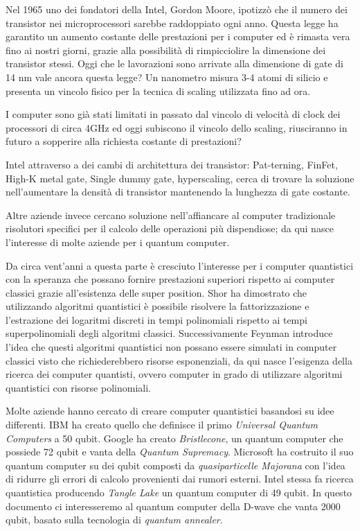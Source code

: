 \cite{S24}Nel 1965 uno dei fondatori della Intel, Gordon Moore, ipotizzò che il numero dei transistor nei microprocessori sarebbe raddoppiato ogni anno. Questa legge ha garantito un aumento costante delle prestazioni per i computer ed è rimasta vera fino ai nostri giorni, grazie alla possibilità di rimpicciolire la dimensione dei transistor stessi. Oggi che le lavorazioni sono arrivate alla dimensione di gate di 14 nm vale ancora questa legge? Un nanometro misura 3-4 atomi di silicio e presenta un vincolo fisico per la tecnica di scaling utilizzata fino ad ora.

I computer sono già stati limitati in passato dal vincolo di velocità di clock dei processori di circa 4GHz ed oggi subiscono il vincolo dello scaling, riusciranno in futuro a sopperire alla richiesta costante di prestazioni?

Intel attraverso a dei cambi di architettura dei transistor: Pat-terning, FinFet, High-K metal gate, Single dummy gate, hyperscaling, cerca di trovare la soluzione nell'aumentare la densità di transistor mantenendo la lunghezza di gate costante.

Altre aziende invece cercano soluzione nell'affiancare al computer tradizionale risolutori specifici per il calcolo delle operazioni più dispendiose; da qui nasce l'interesse di molte aziende per i quantum computer.

\cite{NAC}Da circa vent'anni a questa parte è cresciuto l'interesse per i computer quantistici con la speranza che possano fornire prestazioni superiori rispetto ai computer classici grazie all'esistenza delle super position. Shor ha dimostrato che utilizzando algoritmi quantistici è possibile risolvere la fattorizzazione e l'estrazione dei logaritmi discreti in tempi polinomiali rispetto ai tempi superpolinomiali degli algoritmi classici. Successivamente Feynman introduce l'idea che questi algoritmi quantistici non possano essere simulati in computer classici visto che richiederebbero risorse esponenziali, da qui nasce l'esigenza della ricerca dei computer quantisti, ovvero computer in grado di utilizzare algoritmi quantistici con risorse polinomiali.

Molte aziende hanno cercato di creare computer quantistici basandosi su idee differenti. IBM ha creato quello che definisce il primo \textit{Universal Quantum Computers} a 50 qubit. Google ha creato \textit{Bristlecone}, un quantum computer che possiede 72 qubit e vanta della \textit{Quantum Supremacy}\cite{QS}. Microsoft ha costruito il suo quantum computer su dei qubit composti da \textit{quasiparticelle Majorana} con l'idea di ridurre gli errori di calcolo provenienti dai rumori esterni\cite{MA}. Intel stessa fa ricerca quantistica producendo \textit{Tangle Lake} un quantum computer di 49 qubit\cite{Q49}. In questo documento ci interesseremo al quantum computer della D-wave che vanta 2000 qubit, basato sulla tecnologia di \textit{quantum annealer}.
